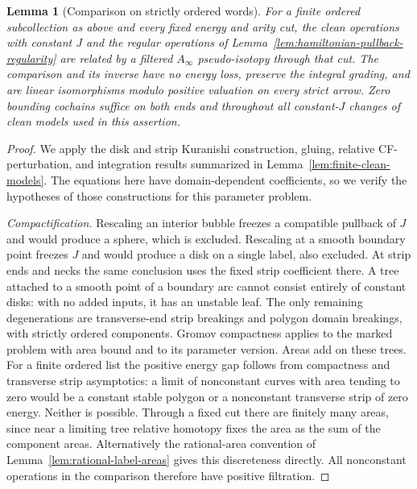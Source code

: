 \documentclass[11pt]{article}
\numberwithin{equation}{section}
\newtheorem{lemma}[theorem]{Lemma}
\theoremstyle{definition}
\theoremstyle{remark}
\begin{document}
\begin{lemma}[Comparison on strictly ordered words]
\label{lem:directed-finite-comparison}
For a finite ordered subcollection as above and every fixed energy
and arity cut, the clean operations with constant $J$ and the
regular operations of Lemma~\ref{lem:hamiltonian-pullback-regularity}
are related by a filtered $A_\infty$ pseudo-isotopy through that
cut.  The comparison and its inverse have no energy loss, preserve
the integral grading, and are linear isomorphisms modulo positive
valuation on every strict arrow.  Zero bounding cochains suffice
on both ends and throughout all constant-$J$ changes of clean
models used in this assertion.
\end{lemma}
\begin{proof}
We apply the disk and strip Kuranishi construction, gluing,
relative CF-perturbation, and integration results summarized in
Lemma~\ref{lem:finite-clean-models}.  The equations here have
domain-dependent coefficients, so we verify the hypotheses of
those constructions for this parameter problem.

\emph{Compactification.}
Rescaling an interior bubble freezes a compatible pullback of $J$
and would produce a sphere, which is excluded.  Rescaling at a
smooth boundary point freezes $J$ and would produce a disk on a
single label, also excluded.  At strip ends and necks the same
conclusion uses the fixed strip coefficient there.  A tree attached
to a smooth point of a boundary arc cannot consist entirely of
constant disks: with no added inputs, it has an unstable leaf.
The only remaining degenerations are transverse-end strip
breakings and polygon domain breakings, with strictly ordered
components.  Gromov compactness applies to the marked problem
with area bound and to its parameter version.  Areas add on these
trees.  For a finite ordered list the positive energy gap follows
from compactness and transverse strip asymptotics: a limit of
nonconstant curves with area tending to zero would be a constant
stable polygon or a nonconstant transverse strip of zero energy.
Neither is possible.  Through a fixed cut there are finitely many
areas, since near a limiting tree relative homotopy fixes the
area as the sum of the component areas.  Alternatively the
rational-area convention of Lemma~\ref{lem:rational-label-areas}
gives this discreteness directly.  All nonconstant operations in
the comparison therefore have positive filtration.


\end{proof}
\end{document}
